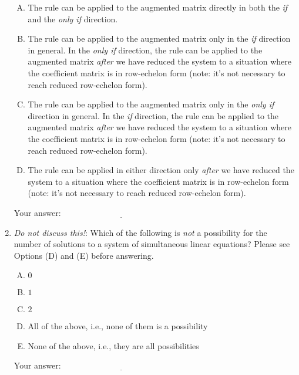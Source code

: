 \documentclass[10pt]{amsart}
\begin{document}
\begin{enumerate}
  \begin{enumerate}[(A)]
  \item The rule can be applied to the augmented matrix directly in
    both the {\em if} and the {\em only if} direction.
  \item The rule can be applied to the augmented matrix only in the
    {\em if} direction in general. In the {\em only if} direction, the
    rule can be applied to the augmented matrix {\em after} we have
    reduced the system to a situation where the coefficient matrix is
    in row-echelon form (note: it's not necessary to reach reduced
    row-echelon form).
  \item The rule can be applied to the augmented matrix only in the
    {\em only if} direction in general. In the {\em if} direction, the
    rule can be applied to the augmented matrix {\em after} we have
    reduced the system to a situation where the coefficient matrix is
    in row-echelon form (note: it's not necessary to reach reduced
    row-echelon form).
  \item The rule can be applied in either direction only {\em after}
    we have reduced the system to a situation where the coefficient
    matrix is in row-echelon form (note: it's not necessary to reach
    reduced row-echelon form).
  \end{enumerate}

  \vspace{0.1in}
  Your answer: $\underline{\qquad\qquad\qquad\qquad\qquad\qquad\qquad}$
  \vspace{0.1in}

\item {\em Do not discuss this!}: Which of the following is {\em not} a
  possibility for the number of solutions to a system of simultaneous
  linear equations? Please see Options (D) and (E) before answering.

  \begin{enumerate}[(A)]
  \item $0$
  \item $1$
  \item $2$
  \item All of the above, i.e., none of them is a possibility
  \item None of the above, i.e., they are all possibilities
  \end{enumerate}

  \vspace{0.1in}
  Your answer: $\underline{\qquad\qquad\qquad\qquad\qquad\qquad\qquad}$
  \vspace{0.1in}


\end{enumerate}
\end{document}
